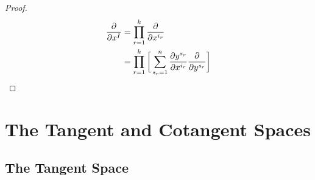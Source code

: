 \documentclass{book}
\begin{document}
\begin{proof}
	\begin{align*}
		\frac{\partial}{\partial x^I}
		& = \prod_{r=1}^k \frac{\partial}{\partial x^{i_r}} \\
		& = \prod_{r=1}^k \bigg[ \sum_{s_r = 1}^n  \frac{\partial y^{s_r}}{\partial x^{i_r}} \frac{\partial}{\partial y^{s_r}} \bigg] \\
	\end{align*}
\end{proof}



































































	\newpage
	\chapter{The Tangent and Cotangent Spaces}
	\section{The Tangent Space}

\end{document}
